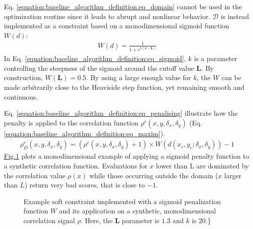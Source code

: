 \documentclass[letterpaper,10pt,english]{jupyterBook}
\begin{document}
\sphinxAtStartPar
Eq. \eqref{equation:baseline_algorithm_definition:eq_domain} cannot be used  in the optimization routine since it leads to
abrupt and non\sphinxhyphen{}linear behavior. \(\mathcal{D}\) is instead implemented as a  constraint based on a
mono\sphinxhyphen{}dimensional sigmoid function \(W(d)\):
\begin{equation}\label{equation:baseline_algorithm_definition:eq_sigmoid}
\begin{split}
W(d)   = \frac{1}{1 + e^{k(d - \mathbf{L})}} 
\end{split}
\end{equation}
\sphinxAtStartPar
In Eq. \eqref{equation:baseline_algorithm_definition:eq_sigmoid}, \(k\) is a parameter controlling the steepness
of the sigmoid around the cut\sphinxhyphen{}off value \(\mathbf{L}\). By construction,
\(W(\mathbf{L}) = 0.5\). By using a large enough value for \(k\), the \(W\)
can be made arbitrarily close to the Heaviside step function, yet
remaining smooth and continuous.

\sphinxAtStartPar
Eq. \eqref{equation:baseline_algorithm_definition:eq_penalising} illustrate how the penalty is applied to the correlation function
\(\rho^c(x,y,\delta_x,\delta_y)\) (Eq. \eqref{equation:baseline_algorithm_definition:eq_maxim}).
\begin{equation}\label{equation:baseline_algorithm_definition:eq_penalising}
\begin{split}
\rho^c_D(x,y,\delta_x,\delta_y) = (\rho^c(x,y,\delta_x,\delta_y) + 1) \times W(d(x_c,y_c;\delta_x,\delta_y)) - 1
\end{split}
\end{equation}
\sphinxAtStartPar
\hyperref[\detokenize{baseline_algorithm_definition:fig-sigmoids}]{Fig.\@ \ref{\detokenize{baseline_algorithm_definition:fig-sigmoids}}} plots a mono\sphinxhyphen{}dimensional example of applying a sigmoid penalty function
to a synthetic correlation function. Evaluations for \(x\) lower than L
are dominated by the correlation value \(\rho(x)\) while those occurring
outside the domain (\(x\) larger than \(L\)) return very bad scores, that is
close to \(-1\).

\begin{figure}[htbp]
\centering
\capstart

\noindent{}
\caption{Example soft constraint implemented with a sigmoid penalization function \(W\) and its application on a synthetic,
mono\sphinxhyphen{}dimensional correlation signal \(\rho\). Here, the \(\mathbf{L}\) parameter is \(1.3\) and \(k\) is \(20\).\}}\label{\detokenize{baseline_algorithm_definition:fig-sigmoids}}\end{figure}
\end{document}
